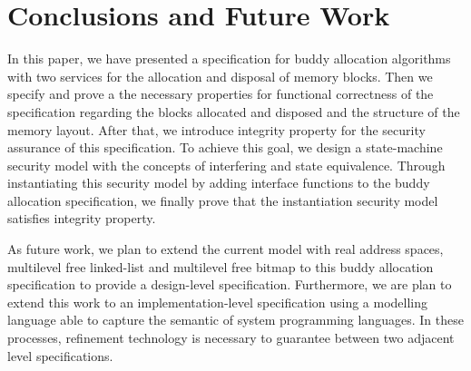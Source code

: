 \section{Conclusions and Future Work}
In this paper, we have presented a specification for buddy allocation algorithms with two services for the allocation and disposal of memory blocks. Then we specify and prove a the necessary properties for functional correctness of the specification regarding the blocks allocated and disposed and the structure of the memory layout. After that, we introduce integrity property for the security assurance of this specification. To achieve this goal, we design a state-machine security model with the concepts of interfering and state equivalence. Through instantiating this security model by adding interface functions to the buddy allocation specification, we finally prove that the instantiation security model satisfies integrity property.

As future work, we plan to extend the current model with real address spaces, multilevel free linked-list and multilevel free bitmap to this buddy allocation specification to provide a design-level specification. Furthermore, we are plan to extend this work to an implementation-level specification using a modelling language able to capture the semantic of system programming languages. In these processes, refinement technology is necessary to guarantee between two adjacent level specifications.